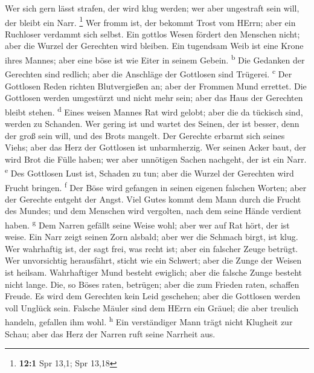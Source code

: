  Wer sich gern lässt strafen, der wird klug werden; wer
aber ungestraft sein will, der bleibt ein Narr. \footnote{\textbf{12:1}
  Spr 13,1; Spr 13,18}  Wer fromm ist, der bekommt Trost
vom HErrn; aber ein Ruchloser verdammt sich selbst.  Ein
gottlos Wesen fördert den Menschen nicht; aber die Wurzel der Gerechten
wird bleiben.  Ein tugendsam Weib ist eine Krone ihres
Mannes; aber eine böse ist wie Eiter in seinem Gebein.
\textsuperscript{b}  Die Gedanken der Gerechten sind
redlich; aber die Anschläge der Gottlosen sind Trügerei.
\textsuperscript{c}  Der Gottlosen Reden richten
Blutvergießen an; aber der Frommen Mund errettet.  Die
Gottlosen werden umgestürzt und nicht mehr sein; aber das Haus der
Gerechten bleibt stehen. \textsuperscript{d}  Eines weisen
Mannes Rat wird gelobt; aber die da tückisch sind, werden zu Schanden.
 Wer gering ist und wartet des Seinen, der ist besser,
denn der groß sein will, und des Brots mangelt.  Der
Gerechte erbarmt sich seines Viehs; aber das Herz der Gottlosen ist
unbarmherzig.  Wer seinen Acker baut, der wird Brot die
Fülle haben; wer aber unnötigen Sachen nachgeht, der ist ein Narr.
\textsuperscript{e}  Des Gottlosen Lust ist, Schaden zu
tun; aber die Wurzel der Gerechten wird Frucht bringen.
\textsuperscript{f}  Der Böse wird gefangen in seinen
eigenen falschen Worten; aber der Gerechte entgeht der Angst.
 Viel Gutes kommt dem Mann durch die Frucht des Mundes;
und dem Menschen wird vergolten, nach dem seine Hände verdient haben.
\textsuperscript{g}  Dem Narren gefällt seine Weise wohl;
aber wer auf Rat hört, der ist weise.  Ein Narr zeigt
seinen Zorn alsbald; aber wer die Schmach birgt, ist klug.
 Wer wahrhaftig ist, der sagt frei, was recht ist; aber
ein falscher Zeuge betrügt.  Wer unvorsichtig
herausfährt, sticht wie ein Schwert; aber die Zunge der Weisen ist
heilsam.  Wahrhaftiger Mund besteht ewiglich; aber die
falsche Zunge besteht nicht lange.  Die, so Böses raten,
betrügen; aber die zum Frieden raten, schaffen Freude. 
Es wird dem Gerechten kein Leid geschehen; aber die Gottlosen werden
voll Unglück sein.  Falsche Mäuler sind dem HErrn ein
Gräuel; die aber treulich handeln, gefallen ihm wohl.
\textsuperscript{h}  Ein verständiger Mann trägt nicht
Klugheit zur Schau; aber das Herz der Narren ruft seine Narrheit aus.
